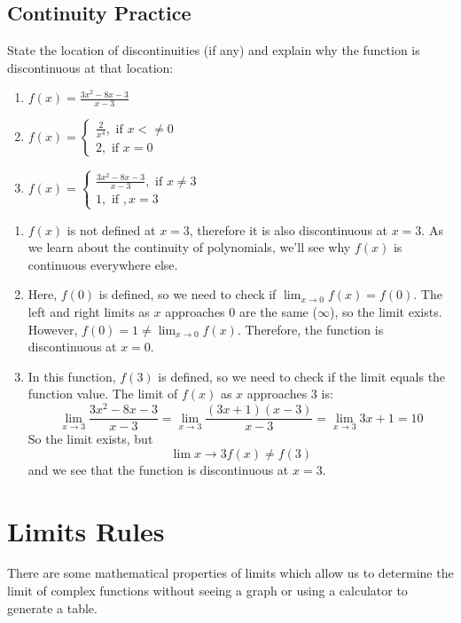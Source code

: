 \subsection{Continuity Practice}
\begin{Exercise}[title=Limits Practice 5, label=limits5]
State the location of discontinuities (if any) and explain why the function is discontinuous at that location:
    \begin{enumerate}
    \item $f(x) = \frac{3x^2-8x-3}{x-3}$
    \item $f(x) = \begin{cases}
    \frac{2}{x^4}, \text{ if } x <\neq 0\\
    2, \text{ if } x=0
    \end{cases}$
    \item $f(x) = \begin{cases}
        \frac{3x^2-8x-3}{x-3}, \text{ if } x \neq 3\\
        1, \text{ if }, x=3
    \end{cases}$
\end{enumerate}
\end{Exercise}
\begin{Answer}[ref=limits5]
    \begin{enumerate}
    \item $f(x)$ is not defined at $x = 3$, therefore it is also discontinuous at $x = 3$. As we learn about the continuity of polynomials, we'll see why $f(x)$ is continuous everywhere else. 
    \item Here, $f(0)$ is defined, so we need to check if $\lim_{x \to 0}f(x) = f(0)$. The left and right limits as $x$ approaches $0$ are the same ($\infty$), so the limit exists. However, $f(0) = 1 \neq \lim_{x\to 0}f(x)$. Therefore, the function is discontinuous at $x=0$.
    \item In this function, $f(3)$ is defined, so we need to check if the limit equals the function value. The limit of $f(x)$ as $x$ approaches $3$ is: $$\lim_{x \to 3}\frac{3x^2-8x-3}{x-3} = \lim_{x \to 3}\frac{(3x+1)(x-3)}{x-3} = \lim_{x \to 3}3x+1 = 10$$ So the limit exists, but $$\lim{x \to 3}f(x) \neq f(3)$$ and we see that the function is discontinuous at $x=3$.
\end{enumerate}
\end{Answer}


\section{Limits Rules}
There are some mathematical properties of limits which allow us to determine the limit of complex functions without seeing a graph or using a calculator to generate a table. 

